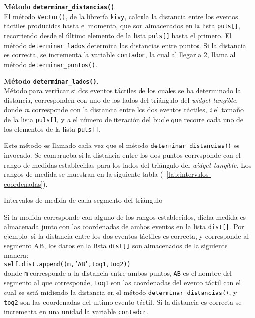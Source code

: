 \textbf{Método \texttt{determinar\_distancias()}}.\\
El método \texttt{Vector()}, de la librería \texttt{kivy}, calcula la distancia entre los eventos táctiles producidos hasta el momento, que son almacenados en la lista \texttt{puls[]}, recorriendo desde el último elemento de la lista \texttt{puls[]} hasta el primero. El método \texttt{determinar\_lados} determina las distancias entre puntos. Si la distancia es correcta, se incrementa la variable \texttt{contador}, la cual al llegar a 2, llama al método \texttt{determinar\_puntos()}.

\textbf{Método \texttt{determinar\_lados()}}.\\
Método para verificar si dos eventos táctiles de los cuales se ha determinado la distancia, corresponden con uno de los lados del triángulo del \emph{widget tangible}, donde \textit{m} corresponde con la distancia entre los dos eventos táctiles, \textit{i} el tamaño de la lista \texttt{puls[]}, y \textit{a} el número de iteración del bucle que recorre cada uno de los elementos de la lista \texttt{puls[]}.

Este método es llamado cada vez que el método \texttt{determinar\_distancias()} es invocado.
Se comprueba si la distancia entre los dos puntos corresponde con el rango de medidas establecidas para los lados del triángulo del \emph{widget tangible}. Los rangos de medida se muestran en la siguiente tabla (~\ref{tab:intervalos-coordenadas}).

\begin{table}[hp]
\centering
{\small

}
\caption[Intervalos de medida de cada segmento del triángulo]
{Intervalos de medida de cada segmento del triángulo}
\label{tab:intervalos-coordenadas}
\end{table}
Si la medida corresponde con alguno de los rangos establecidos, dicha medida es almacenada junto con las coordenadas de ambos eventos en la lista \texttt{dist[]}. Por ejemplo, si la distancia entre los dos eventos táctiles es correcta, y corresponde al segmento AB, los datos en la lista \texttt{dist[]} son almacenados de la siguiente manera:\\
\texttt{self.dist.append((m,'AB',toq1,toq2)) }\\
donde \texttt{m} corresponde a la distancia entre ambos puntos, \texttt{AB} es el nombre del segmento al que corresponde, \texttt{toq1} son las coordenadas del evento táctil con el cual se está midiendo la distancia en el método \texttt{determinar\_distancias()}, y \texttt{toq2} son las coordenadas del ultimo evento táctil.
Si la distancia es correcta se incrementa en una unidad la variable \texttt{contador}.

